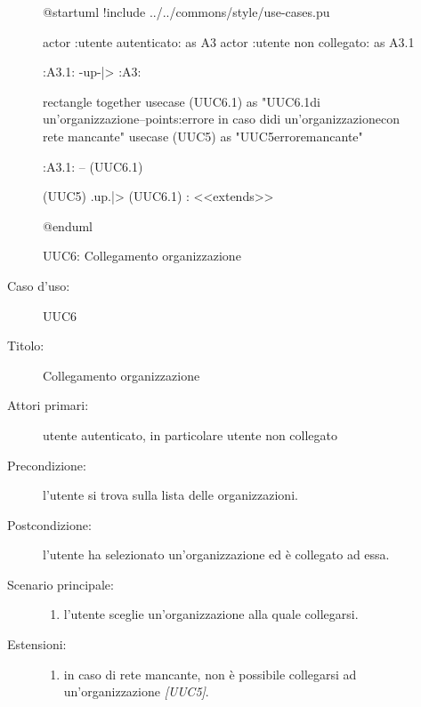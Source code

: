\documentclass[../../../analisi-dei-requisiti.tex]{subfiles}
\begin{document}
\begin{figure}[H]
  \centering
  \begin{plantuml}
  @startuml
  !include ../../commons/style/use-cases.pu

  actor :utente autenticato: as A3
  actor :utente non collegato: as A3.1

  :A3.1: -up-|> :A3:

  rectangle {
    together {
      usecase (UUC6.1) as "UUC6.1\nSelezionamento di un'organizzazione\n--\nExtension points:\nVisualizzazione errore in caso di\nselezionamento di un'organizzazione\n con rete mancante"
      usecase (UUC5) as "UUC5\nVisualizzazione errore\nrete mancante"
    }
  }

  :A3.1: -- (UUC6.1)

  (UUC5) .up.|> (UUC6.1) : <<extends>>

  @enduml
  \end{plantuml}
  \caption{UUC6: Collegamento organizzazione}
  \label{fig:uuc6}
\end{figure}

\begin{description}
  \item[Caso d’uso:] UUC6
  \item[Titolo:] Collegamento organizzazione
  \item[Attori primari:] utente autenticato, in particolare utente non collegato
  \item[Precondizione:] l'utente si trova sulla lista delle organizzazioni.
  \item[Postcondizione:] l'utente ha selezionato un'organizzazione ed è collegato ad essa.
  \item[Scenario principale:]
        \begin{enumerate}
          \item l'utente sceglie un'organizzazione alla quale collegarsi.
        \end{enumerate}
  \item[Estensioni:]
        \begin{enumerate}
          \item in caso di rete mancante, non è possibile collegarsi ad un'organizzazione \emph{[UUC5]}.
        \end{enumerate}
\end{description}
\end{document}
